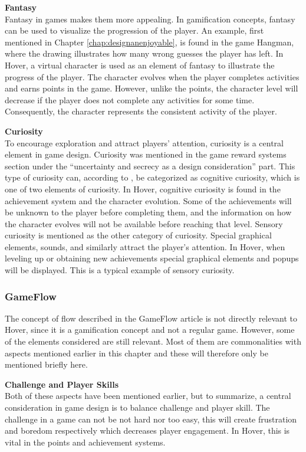 \documentclass[../Main.tex]{subfiles}
\begin{document}
\textbf{Fantasy}\\
Fantasy in games makes them more appealing. In gamification concepts, fantasy can be used to visualize the progression of the player. An example, first mentioned in Chapter \ref{chap:designanenjoyable}, is found in the game Hangman, where the drawing illustrates how many wrong guesses the player has left.  In Hover, a virtual character is used as an element of fantasy to illustrate the progress of the player. The character evolves when the player completes activities and earns points in the game. However, unlike the points, the character level will decrease if the player does not complete any activities for some time. Consequently, the character represents the consistent activity of the player.

\textbf{Curiosity}\\
To encourage exploration and attract players’ attention, curiosity is a central element in game design. Curiosity was mentioned in the game reward systems section under the “uncertainty and secrecy as a design consideration” part. This type of curiosity can, according to \citeauthor{malone_what_1980}, be categorized as cognitive curiosity, which is one of two elements of curiosity. In Hover, cognitive curiosity is found in the achievement system and the character evolution. Some of the achievements will be unknown to the player before completing them, and the information on how the character evolves will not be available before reaching that level. Sensory curiosity is mentioned as the other category of curiosity. Special graphical elements, sounds, and similarly attract the player’s attention. In Hover, when leveling up or obtaining new achievements special graphical elements and popups will be displayed. This is a typical example of sensory curiosity.

\subsubsection{GameFlow}
The concept of flow described in the GameFlow article is not directly relevant to Hover, since it is a gamification concept and not a regular game. However, some of the elements considered are still relevant. Most of them are commonalities with aspects mentioned earlier in this chapter and these will therefore only be mentioned briefly here.

\textbf{Challenge and Player Skills}\\
Both of these aspects have been mentioned earlier, but to summarize, a central consideration in game design is to balance challenge and player skill. The challenge in a game can not be not hard nor too easy, this will create frustration and boredom respectively which decreases player engagement. In Hover, this is vital in the points and achievement systems.
\end{document}
